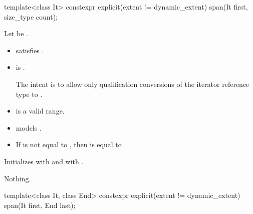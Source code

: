%
\begin{itemdecl}
template<class It>
  constexpr explicit(extent != dynamic_extent) span(It first, size_type count);
\end{itemdecl}

\begin{itemdescr}
\pnum
\constraints
Let  be .
\begin{itemize}
\item {} satisfies .
\item
{} is .
\begin{note}
The intent is to allow only qualification conversions
of the iterator reference type to .
\end{note}
\end{itemize}

\pnum
\expects
\begin{itemize}
\item {} is a valid range.
\item {} models .
\item
If  is not equal to ,
then  is equal to .
\end{itemize}

\pnum
\effects
Initializes  with  and
 with .

\pnum
\throws
Nothing.
\end{itemdescr}

%
\begin{itemdecl}
template<class It, class End>
  constexpr explicit(extent != dynamic_extent) span(It first, End last);
\end{itemdecl}

